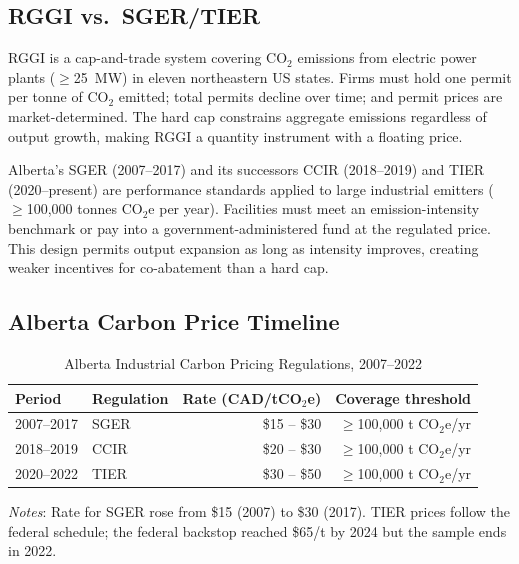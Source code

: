 \documentclass[12pt]{article}
\begin{document}
\subsection*{RGGI vs.\ SGER/TIER}

RGGI is a cap-and-trade system covering CO$_2$ emissions from electric
power plants ($\geq$25~MW) in eleven northeastern US states.
Firms must hold one permit per tonne of CO$_2$ emitted; total permits
decline over time; and permit prices are market-determined.
The hard cap constrains aggregate emissions regardless of output growth,
making RGGI a quantity instrument with a floating price.

Alberta's SGER (2007--2017) and its successors CCIR (2018--2019) and
TIER (2020--present) are performance standards applied to large industrial
emitters ($\geq$100{,}000 tonnes CO$_2$e per year).
Facilities must meet an emission-intensity benchmark or pay into a
government-administered fund at the regulated price.
This design permits output expansion as long as intensity improves,
creating weaker incentives for co-abatement than a hard cap.

\subsection*{Alberta Carbon Price Timeline}

\begin{table}[h]
\centering
\small
\caption{Alberta Industrial Carbon Pricing Regulations, 2007--2022}
\label{tab:policy}
\begin{threeparttable}
\begin{tabular}{llrr}
\toprule
Period & Regulation & Rate (CAD/tCO$_2$e) & Coverage threshold \\
\midrule
2007--2017 & SGER & \$15 -- \$30 & $\geq$100{,}000 t CO$_2$e/yr \\
2018--2019 & CCIR & \$20 -- \$30 & $\geq$100{,}000 t CO$_2$e/yr \\
2020--2022 & TIER & \$30 -- \$50 & $\geq$100{,}000 t CO$_2$e/yr \\
\bottomrule
\end{tabular}
\begin{tablenotes}
\small
\item \textit{Notes}: Rate for SGER rose from \$15 (2007) to \$30 (2017).
  TIER prices follow the federal schedule; the federal backstop reached
  \$65/t by 2024 but the sample ends in 2022.
\end{tablenotes}
\end{threeparttable}
\end{table}
\end{document}
